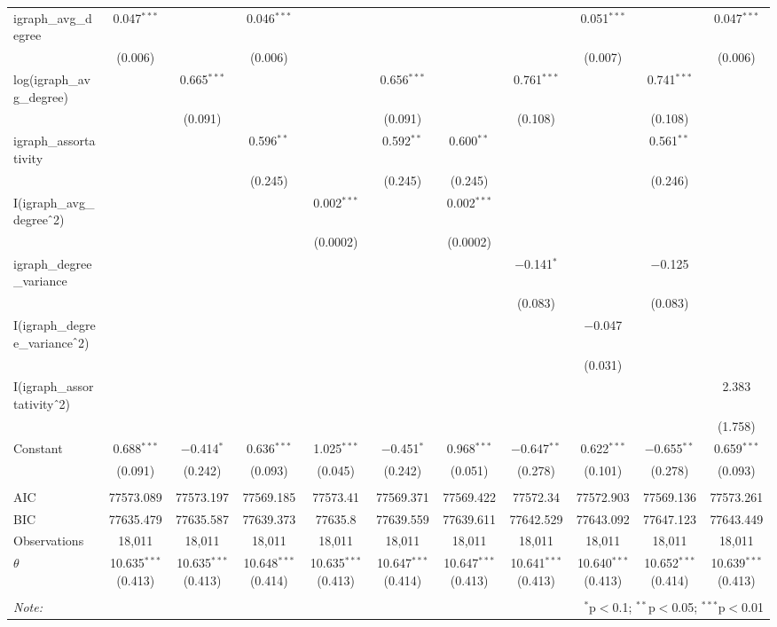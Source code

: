 \begin{table}[!htbp]
\begin{tabular}{@{\extracolsep{5pt}}lcccccccccc}
  igraph\_avg\_degree & 0.047$^{***}$ &  & 0.046$^{***}$ &  &  &  &  & 0.051$^{***}$ &  & 0.047$^{***}$ \\ 
  & (0.006) &  & (0.006) &  &  &  &  & (0.007) &  & (0.006) \\ 
  log(igraph\_avg\_degree) &  & 0.665$^{***}$ &  &  & 0.656$^{***}$ &  & 0.761$^{***}$ &  & 0.741$^{***}$ &  \\ 
  &  & (0.091) &  &  & (0.091) &  & (0.108) &  & (0.108) &  \\ 
  igraph\_assortativity &  &  & 0.596$^{**}$ &  & 0.592$^{**}$ & 0.600$^{**}$ &  &  & 0.561$^{**}$ &  \\ 
  &  &  & (0.245) &  & (0.245) & (0.245) &  &  & (0.246) &  \\ 
  I(igraph\_avg\_degree$\hat{\mkern6mu}$2) &  &  &  & 0.002$^{***}$ &  & 0.002$^{***}$ &  &  &  &  \\ 
  &  &  &  & (0.0002) &  & (0.0002) &  &  &  &  \\ 
  igraph\_degree\_variance &  &  &  &  &  &  & $-$0.141$^{*}$ &  & $-$0.125 &  \\ 
  &  &  &  &  &  &  & (0.083) &  & (0.083) &  \\ 
  I(igraph\_degree\_variance$\hat{\mkern6mu}$2) &  &  &  &  &  &  &  & $-$0.047 &  &  \\ 
  &  &  &  &  &  &  &  & (0.031) &  &  \\ 
  I(igraph\_assortativity$\hat{\mkern6mu}$2) &  &  &  &  &  &  &  &  &  & 2.383 \\ 
  &  &  &  &  &  &  &  &  &  & (1.758) \\ 
  Constant & 0.688$^{***}$ & $-$0.414$^{*}$ & 0.636$^{***}$ & 1.025$^{***}$ & $-$0.451$^{*}$ & 0.968$^{***}$ & $-$0.647$^{**}$ & 0.622$^{***}$ & $-$0.655$^{**}$ & 0.659$^{***}$ \\ 
  & (0.091) & (0.242) & (0.093) & (0.045) & (0.242) & (0.051) & (0.278) & (0.101) & (0.278) & (0.093) \\ 
 \hline \\[-1.8ex] 
AIC & 77573.089 & 77573.197 & 77569.185 & 77573.41 & 77569.371 & 77569.422 & 77572.34 & 77572.903 & 77569.136 & 77573.261 \\ 
BIC & 77635.479 & 77635.587 & 77639.373 & 77635.8 & 77639.559 & 77639.611 & 77642.529 & 77643.092 & 77647.123 & 77643.449 \\ 
Observations & 18,011 & 18,011 & 18,011 & 18,011 & 18,011 & 18,011 & 18,011 & 18,011 & 18,011 & 18,011 \\ 
$\theta$ & 10.635$^{***}$  (0.413) & 10.635$^{***}$  (0.413) & 10.648$^{***}$  (0.414) & 10.635$^{***}$  (0.413) & 10.647$^{***}$  (0.414) & 10.647$^{***}$  (0.413) & 10.641$^{***}$  (0.413) & 10.640$^{***}$  (0.413) & 10.652$^{***}$  (0.414) & 10.639$^{***}$  (0.413) \\ 
\hline 
\hline \\[-1.8ex] 
\textit{Note:}  & \multicolumn{10}{r}{$^{*}$p$<$0.1; $^{**}$p$<$0.05; $^{***}$p$<$0.01} \\ 
\end{tabular} 
\end{table} 
